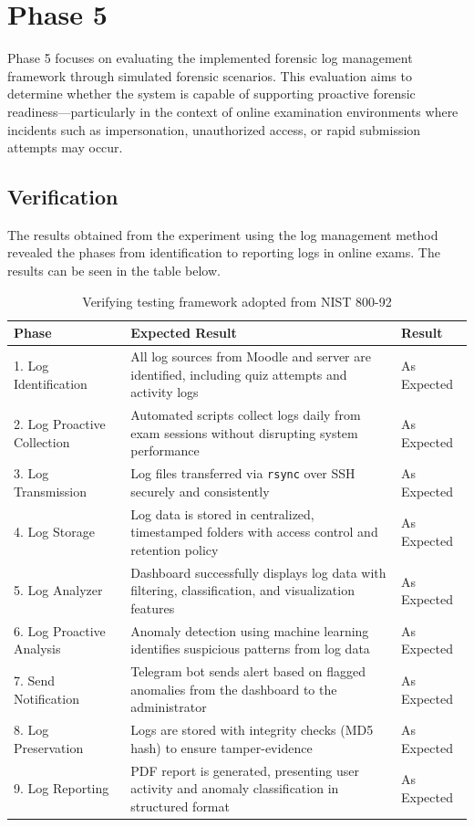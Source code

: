 \section{Phase 5}
Phase 5 focuses on evaluating the implemented forensic log management framework through simulated forensic scenarios. This evaluation aims to determine whether the system is capable of supporting proactive forensic readiness—particularly in the context of online examination environments where incidents such as impersonation, unauthorized access, or rapid submission attempts may occur.
\subsection{Verification}
The results obtained from the experiment using the log management method revealed the phases from identification to reporting logs in online exams. The results can be seen in the table below.

\begin{table}[H]
	\centering
	\caption{Verifying testing framework adopted from NIST 800-92}
	\begin{tabular}{|p{3.2cm}|p{6cm}|p{4cm}|}
		\hline
		\textbf{Phase} & \textbf{Expected Result} & \textbf{Result} \\ \hline
		1. Log Identification & All log sources from Moodle and server are identified, including quiz attempts and activity logs & As Expected \\ \hline
		2. Log Proactive Collection & Automated scripts collect logs daily from exam sessions without disrupting system performance & As Expected \\ \hline
		3. Log Transmission & Log files transferred via \texttt{rsync} over SSH securely and consistently & As Expected \\ \hline
		4. Log Storage & Log data is stored in centralized, timestamped folders with access control and retention policy & As Expected \\ \hline
		5. Log Analyzer & Dashboard successfully displays log data with filtering, classification, and visualization features & As Expected \\ \hline
		6. Log Proactive Analysis & Anomaly detection using machine learning identifies suspicious patterns from log data & As Expected \\ \hline
		7. Send Notification & Telegram bot sends alert based on flagged anomalies from the dashboard to the administrator & As Expected \\ \hline
		8. Log Preservation & Logs are stored with integrity checks (MD5 hash) to ensure tamper-evidence & As Expected \\ \hline
		9. Log Reporting & PDF report is generated, presenting user activity and anomaly classification in structured format & As Expected \\ \hline
	\end{tabular}
	\label{tab:verifying_log_framework}
\end{table}


